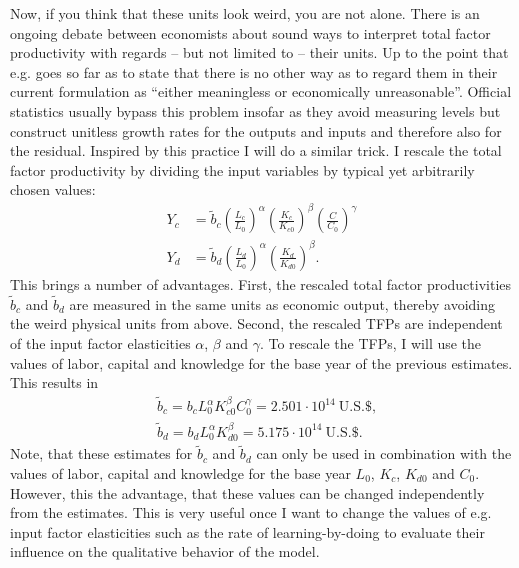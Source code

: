 Now, if you think that these units look weird, you are not alone. There is an ongoing debate between economists about sound ways to interpret total factor productivity with regards -- but not limited to -- their units. Up to the point that e.g. \cite{Barnett2007} goes so far as to state that there is no other way as to regard them in their current formulation as ``either meaningless or economically unreasonable''. Official statistics usually bypass this problem insofar as they avoid measuring levels but construct unitless growth rates for the outputs and inputs and therefore also for the residual. Inspired by this practice I will do a similar trick. I rescale the total factor productivity by dividing the input variables by typical yet arbitrarily chosen values:
\begin{align}
  Y_c &= \tilde{b}_c \left( \frac{L_c}{L_0} \right)^{\alpha} \left( \frac{K_c}{K_{c0}} \right)^{\beta} \left( \frac{C}{C_0} \right)^{\gamma} \label{eq:rescalled_TFP_clean} \\
  Y_d &= \tilde{b}_d \left( \frac{L_d}{L_0} \right)^{\alpha} \left( \frac{K_d}{K_{d0}} \right)^{\beta}. \label{eq:rescalled_TFP_dirty}
\end{align}
This brings a number of advantages. First, the rescaled total factor productivities $\tilde{b}_c$ and $\tilde{b}_d$ are measured in the same units as economic output, thereby avoiding the weird physical units from above. Second, the rescaled TFPs are independent of the input factor elasticities $\alpha$, $\beta$ and $\gamma$.
To rescale the TFPs, I will use the values of labor, capital and knowledge for the base year of the previous estimates. This results in
\begin{align} 
  &\tilde{b}_c = b_c L_0^{\alpha}K_{c0}^\beta C_0^{\gamma} = 2.501 \cdot 10^{14} ~ \mathrm{U.S. \$}, \\
  &\tilde{b}_d = b_d L_0^{\alpha}K_{d0}^\beta =              5.175 \cdot 10^{14} ~ \mathrm{U.S. \$}.
  \label{eq:rescalled_TFP_values}
\end{align}
Note, that these estimates for $\tilde{b}_c$ and $\tilde{b}_d$ can only be used in combination with the values of labor, capital and knowledge for the base year $L_0$, $K_{c}$, $K_{d0}$ and $C_0$. However, this the advantage, that these values can be changed independently from the estimates. This is very useful once I want to change the values of e.g. input factor elasticities such as the rate of learning-by-doing to evaluate their influence on the qualitative behavior of the model.\\

